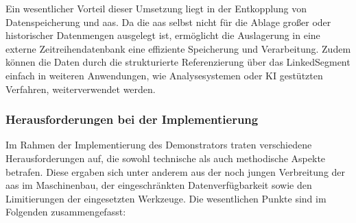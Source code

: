 Ein wesentlicher Vorteil dieser Umsetzung liegt in der Entkopplung von Datenspeicherung und \acs{aas}. 
Da die \acs{aas} selbst nicht für die Ablage großer oder historischer Datenmengen ausgelegt ist, ermöglicht die Auslagerung in eine externe Zeitreihendatenbank eine effiziente Speicherung und Verarbeitung. 
Zudem können die Daten durch die strukturierte Referenzierung über das LinkedSegment einfach in weiteren Anwendungen, wie Analysesystemen oder KI gestützten Verfahren, weiterverwendet werden.

\subsubsection{Herausforderungen bei der Implementierung}
Im Rahmen der Implementierung des Demonstrators traten verschiedene Herausforderungen auf, die sowohl technische als auch methodische Aspekte betrafen. 
Diese ergaben sich unter anderem aus der noch jungen Verbreitung der \acs{aas} im Maschinenbau, der eingeschränkten Datenverfügbarkeit sowie den Limitierungen der eingesetzten Werkzeuge. 
Die wesentlichen Punkte sind im Folgenden zusammengefasst:

